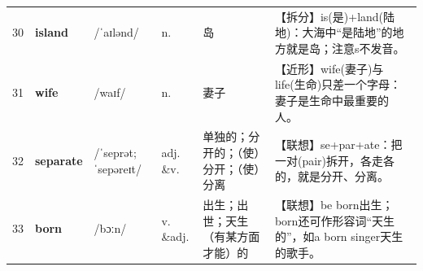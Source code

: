 \documentclass[UTF8,a4paper,11pt,oneside]{ctexbook}
\newcommand{\cellword}[1]{{\bfseries\textcolor{wordcol}{#1}}}
\newcommand{\cellipa}[1]{{\footnotesize\textcolor{ipacol}{#1}}}
\newcommand{\cellpos}[1]{\textcolor{poscol}{#1}}
\newcommand{\cellno}[1]{\textcolor{volcolor!75!black}{#1}}
\begin{document}
{\begin{longtable}{@{}C{0.045\textwidth}L{0.155\textwidth}L{0.175\textwidth}C{0.070\textwidth}L{0.180\textwidth}L{0.282\textwidth}@{}}
\cellno{30} & \cellword{island} & \cellipa{/ˈaɪlənd/} & \cellpos{n.} & 岛 & \textcolor{tagSplit}{【拆分】}is(是)+land(陆地)：大海中“是陆地”的地方就是岛；注意s不发音。 \\
 \cellno{31} & \cellword{wife} & \cellipa{/waɪf/} & \cellpos{n.} & 妻子 & \textcolor{tagNear}{【近形】}wife(妻子)与life(生命)只差一个字母：妻子是生命中最重要的人。 \\
\cellno{32} & \cellword{separate} & \cellipa{/ˈseprət; ˈsepəreɪt/} & \cellpos{adj. \&v.} & 单独的；分开的；（使）分开；（使）分离 & \textcolor{tagAssoc}{【联想】}se+par+ate：把一对(pair)拆开，各走各的，就是分开、分离。 \\
 \cellno{33} & \cellword{born} & \cellipa{/bɔːn/} & \cellpos{v. \&adj.} & 出生；出世；天生（有某方面才能）的 & \textcolor{tagAssoc}{【联想】}be born出生；born还可作形容词“天生的”，如a born singer天生的歌手。 \\
\end{longtable}
}

\end{document}
